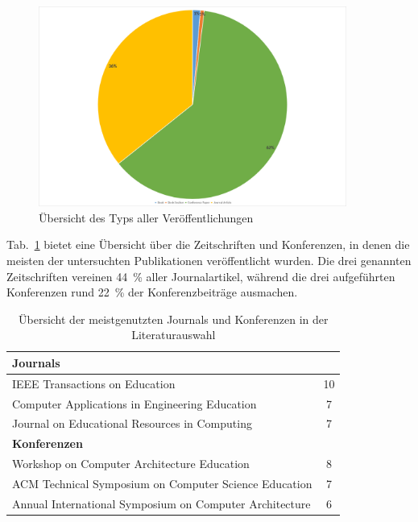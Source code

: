 \begin{figure}[htbp]
    \centering
    \includegraphics[width=0.90\textwidth]{graphics/2-typ.png}
    \caption{Übersicht des Typs aller Veröffentlichungen}
    \label{fig:2-typ}
\end{figure}

Tab.~\ref{tab:pub-typen} bietet eine Übersicht über die Zeitschriften und Konferenzen, in denen die meisten der untersuchten Publikationen veröffentlicht wurden. Die drei genannten Zeitschriften vereinen 44~\% aller Journalartikel, während die drei aufgeführten Konferenzen rund 22~\% der Konferenzbeiträge ausmachen.

\begin{table}[htbp]
\centering
    \begin{tabularx}{\textwidth}{X c}
        \hline
        \multicolumn{2}{l}{\textbf{Journals}} \\
        \hline
        IEEE Transactions on Education & 10 \\
        Computer Applications in Engineering Education & 7 \\
        Journal on Educational Resources in Computing & 7 \\
        \hline
        \multicolumn{2}{l}{\textbf{Konferenzen}} \\
        \hline
        Workshop on Computer Architecture Education & 8 \\
        ACM Technical Symposium on Computer Science Education & 7 \\
        Annual International Symposium on Computer Architecture & 6 \\
        \hline
    \end{tabularx}
\caption{Übersicht der meistgenutzten Journals und Konferenzen in der Literaturauswahl}
\label{tab:pub-typen}
\end{table}

